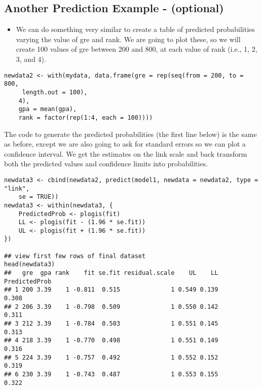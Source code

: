 \documentclass[]{article}
\begin{document}
\subsection{Another Prediction Example - (optional)}
\begin{itemize}
\item We can do something very similar to create a table of predicted probabilities varying the value of gre and rank. We are going to plot these, so we will create 100 values of gre between 200 and 800, at each value of rank (i.e., 1, 2, 3, and 4).
\end{itemize}
\begin{framed}
\begin{verbatim}
newdata2 <- with(mydata, data.frame(gre = rep(seq(from = 200, to = 800, 
     length.out = 100),
    4), 
    gpa = mean(gpa), 
    rank = factor(rep(1:4, each = 100))))
\end{verbatim}
\end{framed}
The code to generate the predicted probabilities (the first line below) is the same as before, except we are also going to ask for standard errors so we can plot a confidence interval. We get the estimates on the link scale and back transform both the predicted values and confidence limits into probabilities.
\begin{framed}
\begin{verbatim}
newdata3 <- cbind(newdata2, predict(model1, newdata = newdata2, type = "link",
    se = TRUE))
newdata3 <- within(newdata3, {
    PredictedProb <- plogis(fit)
    LL <- plogis(fit - (1.96 * se.fit))
    UL <- plogis(fit + (1.96 * se.fit))
})

## view first few rows of final dataset
head(newdata3)
##   gre  gpa rank    fit se.fit residual.scale    UL    LL PredictedProb
## 1 200 3.39    1 -0.811  0.515              1 0.549 0.139         0.308
## 2 206 3.39    1 -0.798  0.509              1 0.550 0.142         0.311
## 3 212 3.39    1 -0.784  0.503              1 0.551 0.145         0.313
## 4 218 3.39    1 -0.770  0.498              1 0.551 0.149         0.316
## 5 224 3.39    1 -0.757  0.492              1 0.552 0.152         0.319
## 6 230 3.39    1 -0.743  0.487              1 0.553 0.155         0.322
\end{verbatim}
\end{framed}
\newpage
%
\end{document}
